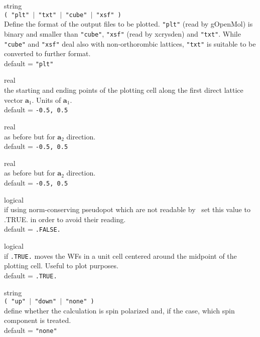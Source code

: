 {\noindent{}%
{\sc string} \\ {\tt ( "plt" $\mid$ "txt" $\mid$ "cube" $\mid$ "xsf" ) }\\
              Define the format of the output files to be plotted. 
              {\tt "plt"} (read by {\sc gOpenMol}) is binary and smaller than 
              {\tt "cube"}, {\tt "xsf"} (read by {\sc xcrysden}) and
              {\tt "txt"}. While {\tt "cube"} and {\tt "xsf"} deal also 
              with non-orthorombic lattices, {\tt "txt"} is suitable to be converted 
              to further format.\\
              {\sc default} = {\tt "plt"} \par

\noindent{}%
{\sc real} \\ the starting and ending points of the plotting cell along the 
              first direct lattice vector $\mathbf{a}_1$.
              Units of $\mathbf{a}_1$.\\
              {\sc default} = {\tt -0.5, 0.5} \par

\noindent{}%
{\sc real} \\ as before but for $\mathbf{a}_2$ direction.\\
              {\sc default} = {\tt -0.5, 0.5} \par

\noindent{}%
{\sc real} \\ as before but for $\mathbf{a}_2$ direction.\\
              {\sc default} = {\tt -0.5, 0.5} \par

\noindent{}%
{\sc logical} \\ if using norm-conserving pseudopot which are not readable 
               by \WANT\ set this value to .TRUE. in order to avoid their reading.\\
              {\sc default} = {\tt .FALSE.} \par

\noindent{}%
{\sc logical} \\ if {\tt .TRUE.} moves the WFs in a unit cell centered around the 
    midpoint of the plotting cell. Useful to plot purposes.\\
              {\sc default} = {\tt .TRUE.} \par

\noindent{}%
{\sc string} \\ {\tt ( "up" $\mid$ "down" $\mid$ "none" ) }\\
              define whether the calculation is spin polarized and, if the case,
              which spin component is treated.\\
              {\sc default} = {\tt "none"} \par
}
